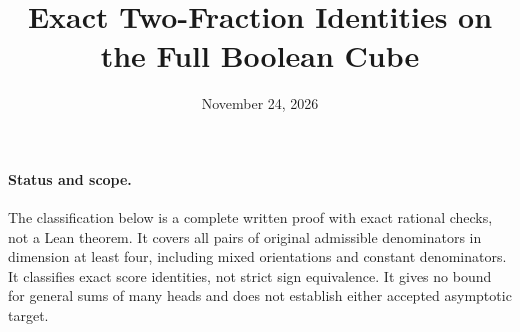 \documentclass[11pt]{article}
\begin{document}
\title{Exact Two-Fraction Identities on the Full Boolean Cube}
\author{}
\date{November 24, 2026}
\maketitle

\paragraph{Status and scope.}
The classification below is a complete written proof with exact rational
checks, not a Lean theorem. It covers all pairs of original admissible
denominators in dimension at least four, including mixed orientations
and constant denominators. It classifies exact score identities, not
strict sign equivalence. It gives no bound for general sums of many
heads and does not establish either accepted asymptotic target.
\end{document}
